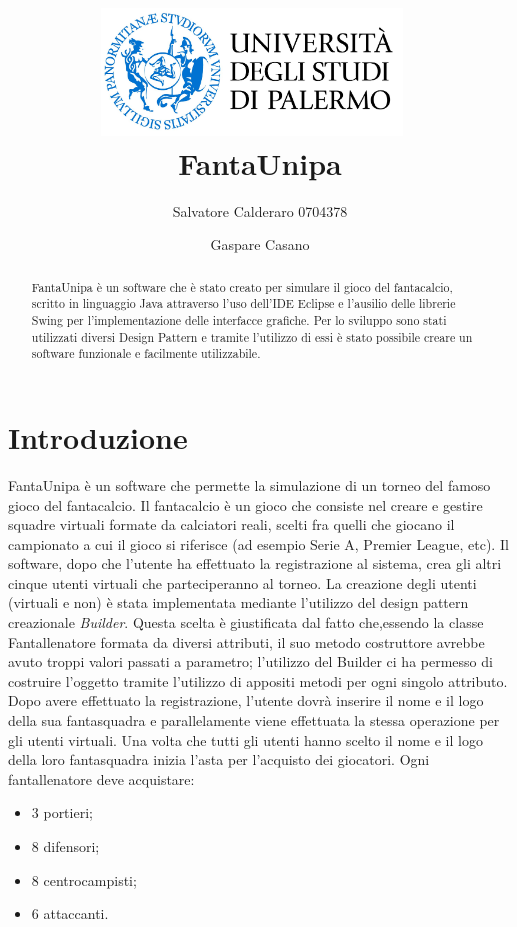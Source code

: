 \documentclass[12pt,a4paper]{article}
\title{%
\includegraphics[width=0.6\textwidth]{unipa.jpg}{\centering}~
\\[2cm]
FantaUnipa
\\[2cm]
}
\author{Salvatore Calderaro 0704378 \and Gaspare Casano}
\begin{document}
\date  {}
\maketitle
\thispagestyle{empty}
\newpage
\tableofcontents
\newpage
{}
\begin{abstract} 
FantaUnipa è un software che è stato creato per simulare il gioco del fantacalcio, scritto in linguaggio Java attraverso l'uso dell'IDE Eclipse e l'ausilio delle librerie Swing per l'implementazione delle interfacce grafiche. Per lo sviluppo sono stati utilizzati diversi Design Pattern e tramite l'utilizzo di essi è stato possibile creare un software funzionale e facilmente utilizzabile. 
\end{abstract}
\newpage
{}
\section{Introduzione}
FantaUnipa è un software che permette la simulazione di un torneo del famoso gioco del fantacalcio. Il fantacalcio è un gioco che consiste nel creare e gestire squadre virtuali formate da calciatori reali, scelti fra quelli che giocano il campionato a cui il gioco si riferisce (ad esempio Serie A, Premier League, etc). Il software, dopo che l'utente ha effettuato la registrazione al sistema, crea gli altri cinque utenti virtuali che parteciperanno al torneo. La creazione degli utenti (virtuali e non) è stata implementata mediante l'utilizzo del design pattern creazionale  \textit{Builder}. Questa scelta è giustificata dal fatto che,essendo la classe Fantallenatore formata da diversi attributi, il suo metodo costruttore avrebbe avuto troppi  valori passati a parametro; l'utilizzo del Builder ci ha permesso di costruire l'oggetto tramite l'utilizzo di appositi metodi per ogni singolo attributo.\\
Dopo avere effettuato la registrazione, l'utente dovrà inserire il nome e il logo della sua fantasquadra e parallelamente viene effettuata la stessa operazione per gli utenti virtuali. Una volta che tutti gli utenti hanno scelto il nome e il logo della loro fantasquadra inizia l'asta per l'acquisto dei giocatori. Ogni fantallenatore deve acquistare:
\begin{itemize}
\item 3 portieri;
\item 8 difensori;
\item 8 centrocampisti;
\item 6 attaccanti.
\end{itemize}
\end{document}
